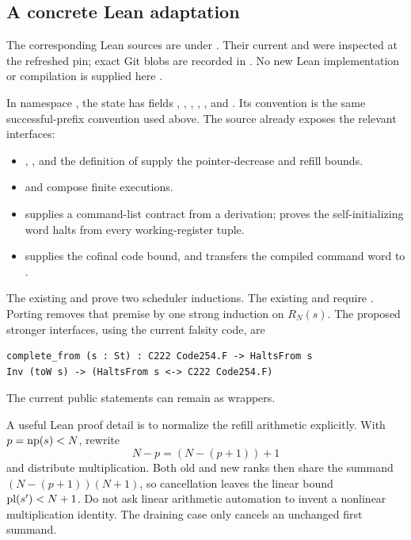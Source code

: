 \subsection{A concrete Lean adaptation}

The corresponding Lean sources are under . Their current  and  were inspected at the refreshed pin; exact Git blobs are recorded in . No new Lean implementation or compilation is supplied here \cite{leanenum}.

In namespace , the state  has fields , , , , , and . Its  convention is the same successful-prefix convention used above. The source already exposes the relevant interfaces:
\begin{itemize}
\item {}, , and the definition of  supply the pointer-decrease and refill bounds.
\item {} and  compose finite executions.
\item {} supplies a command-list contract from a derivation;  proves the self-initializing word halts from every working-register tuple.
\item {} supplies the cofinal code bound, and  transfers the compiled command word to .
\end{itemize}

The existing  and  prove two scheduler inductions. The existing  and  require . Porting  removes that premise by one strong induction on $R_N(s)$. The proposed stronger interfaces, using the current falsity code, are
\begin{lstlisting}
complete_from (s : St) : C222 Code254.F -> HaltsFrom s
Inv (toW s) -> (HaltsFrom s <-> C222 Code254.F)
\end{lstlisting}
The current public statements can remain as wrappers.

A useful Lean proof detail is to normalize the refill arithmetic explicitly. With $p=\operatorname{np}(s)<N$, rewrite
\[
 N-p=(N-(p+1))+1
\]
and distribute multiplication. Both old and new ranks then share the summand $(N-(p+1))(N+1)$, so cancellation leaves the linear bound $\operatorname{pl}(s')<N+1$. Do not ask linear arithmetic automation to invent a nonlinear multiplication identity. The draining case only cancels an unchanged first summand.

